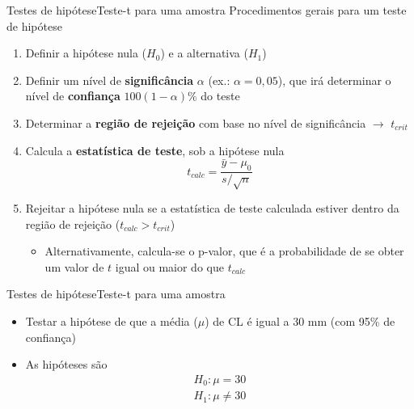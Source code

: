 \documentclass[10pt]{beamer}\usepackage[]{graphicx}\usepackage[]{color}
\begin{document}
\begin{frame}[fragile=singleslide]{Testes de hipótese}{Teste-t
    para uma amostra}
Procedimentos gerais para um teste de hipótese
\begin{enumerate}
\item Definir a hipótese nula ($H_0$) e a alternativa ($H_1$)
\item Definir um nível de \textbf{significância} $\alpha$ (ex.: $\alpha
  = 0,05$), que irá determinar o nível de \textbf{confiança}
  $100(1-\alpha)\%$ do teste
\item Determinar a \textbf{região de rejeição} com base no nível de
  significância $\rightarrow$ $t_{crit}$
\item Calcula a \textbf{estatística de teste}, sob a hipótese nula
  \begin{equation*}
    t_{calc} = \frac{\bar{y} - \mu_0}{s/\sqrt{n}}
  \end{equation*}
\item Rejeitar a hipótese nula se a estatística de teste calculada
  estiver dentro da região de rejeição ($t_{calc} > t_{crit}$)
  \begin{itemize}
  \item Alternativamente, calcula-se o p-valor, que é a probabilidade de
    se obter um valor de $t$ igual ou maior do que $t_{calc}$
  \end{itemize}
\end{enumerate}
\end{frame}

\begin{frame}[fragile=singleslide]{Testes de hipótese}{Teste-t para uma
    amostra}
  \begin{itemize}
  \item Testar a hipótese de que a média ($\mu$) de CL é igual a 30 mm
    (com 95\% de confiança)
  \item As hipóteses são
    \begin{align*}
      H_0: \mu = 30 \\
      H_1: \mu \neq 30
    \end{align*}
  \end{itemize}
\end{frame}
\end{document}
